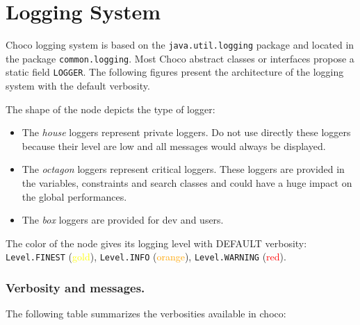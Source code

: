 \section{Logging System}\label{advanced:loggingsystem}\hypertarget{advanced:loggingsystem}{}

Choco logging system is based on the \texttt{java.util.logging} package and located in the package \texttt{common.logging}.
Most Choco abstract classes or interfaces propose a static field \texttt{LOGGER}.
The following figures present the architecture of the logging system with the default verbosity.


The shape of the node depicts the type of logger:
\begin{itemize}
	\item The \emph{house} loggers represent private loggers. Do not use directly these loggers because their level are low and all messages would always be displayed.
	\item The \emph{octagon} loggers represent critical loggers. These loggers are provided in the variables, constraints and search classes and could have a huge impact on the global performances.
	\item The \emph{box} loggers are provided for dev and users.
\end{itemize}
The color of the node gives its logging level with DEFAULT verbosity:
\texttt{Level.FINEST} (\textcolor{yellow}{gold}),
\texttt{Level.INFO} (\textcolor{orange}{orange}),
\texttt{Level.WARNING} (\textcolor{red}{red}).

\subsubsection{Verbosity and messages.}\label{advanced:verbosityandmessages}\hypertarget{advanced:verbosityandmessages}{}
The following table summarizes the verbosities available in choco: 

